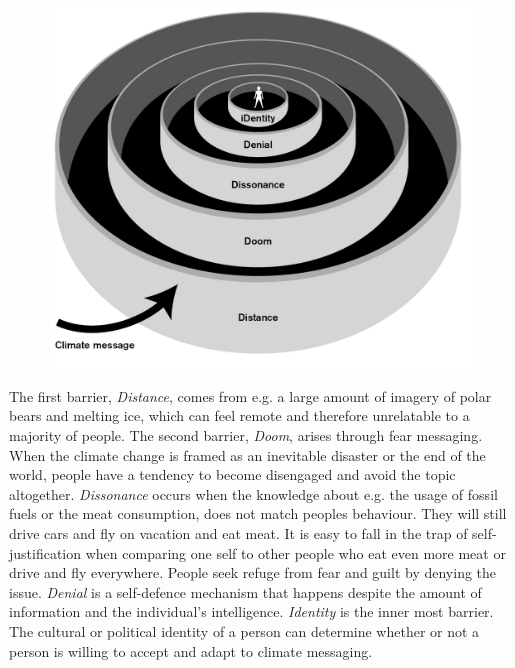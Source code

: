         \begin{figure}[H]
        	\centering
        	\includegraphics[width=0.9\linewidth]{figure/Analysis/5ds.png}
        	\label{fig:5ds}
        \end{figure}
        
        The first barrier, \textit{Distance}, comes from e.g. a large amount of imagery of polar bears and melting ice, which can feel remote and therefore unrelatable to a majority of people\citep[p.~108]{storyAboutClimateChange}. The second barrier, \textit{Doom}, arises through fear messaging. When the climate change is framed as an inevitable disaster or the end of the world, people have a tendency to become disengaged and avoid the topic altogether\citep[p.~109]{storyAboutClimateChange}\cite{the5Ds}. \textit{Dissonance} occurs when the knowledge about e.g. the usage of fossil fuels or the meat consumption, does not match peoples behaviour. They will still drive cars and fly on vacation and eat meat. It is easy to fall in the trap of self-justification when comparing one self to other people who eat even more meat or drive and fly everywhere\citep[p.~109]{storyAboutClimateChange}\cite{the5Ds}.
        People seek refuge from fear and guilt by denying the issue. \textit{Denial} is a self-defence mechanism that happens despite the amount of information and the individual's intelligence\citep[p.~109]{storyAboutClimateChange}. \textit{Identity} is the inner most barrier. The cultural or political identity of a person can determine whether or not a person is willing to accept and adapt to climate messaging\citep[p.~109]{storyAboutClimateChange}.
        
